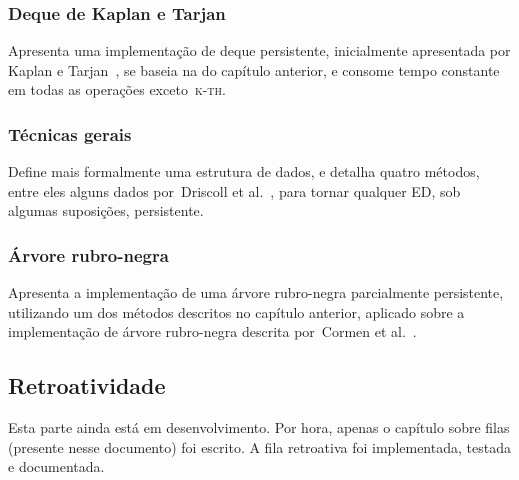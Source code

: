\documentclass[quali.tex]{subfile}
\begin{document}
\subsubsection*{Deque de Kaplan e Tarjan}
	Apresenta uma implementação de deque persistente, inicialmente apresentada por Kaplan e Tarjan~\cite{KaplanT1999}, se baseia na do capítulo anterior, e consome tempo constante em todas as operações exceto~\textsc{k-th}.
\subsubsection*{Técnicas gerais}
	Define mais formalmente uma estrutura de dados, e detalha quatro métodos, entre eles alguns dados por~Driscoll et al.~\cite{DriscollSST1989}, para tornar qualquer ED, sob algumas suposições, persistente.
\subsubsection*{Árvore rubro-negra}
	Apresenta a implementação de uma árvore rubro-negra parcialmente persistente, utilizando um dos métodos descritos no capítulo anterior, aplicado sobre a implementação de árvore rubro-negra descrita por~Cormen et al.~\cite{CormenRedBlack}.

\subsection{Retroatividade}

Esta parte ainda está em desenvolvimento. Por hora, apenas o capítulo sobre filas (presente nesse documento) foi escrito. A fila retroativa foi implementada, testada e documentada.
\end{document}
